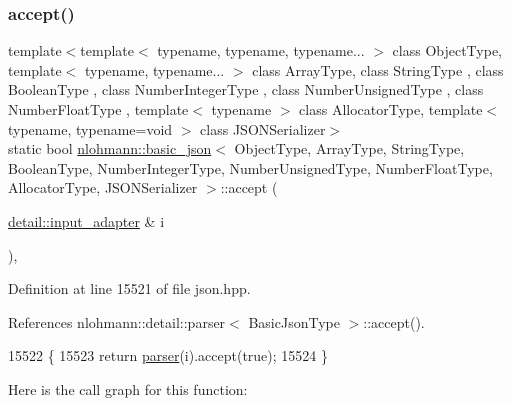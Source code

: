\subsubsection{\texorpdfstring{accept()}{accept()}\hspace{0.1cm}{\footnotesize\ttfamily [2/3]}}
{\footnotesize\ttfamily template$<$template$<$ typename, typename, typename... $>$ class Object\+Type, template$<$ typename, typename... $>$ class Array\+Type, class String\+Type , class Boolean\+Type , class Number\+Integer\+Type , class Number\+Unsigned\+Type , class Number\+Float\+Type , template$<$ typename $>$ class Allocator\+Type, template$<$ typename, typename=void $>$ class J\+S\+O\+N\+Serializer$>$ \\
static bool \hyperlink{classnlohmann_1_1basic__json}{nlohmann\+::basic\+\_\+json}$<$ Object\+Type, Array\+Type, String\+Type, Boolean\+Type, Number\+Integer\+Type, Number\+Unsigned\+Type, Number\+Float\+Type, Allocator\+Type, J\+S\+O\+N\+Serializer $>$\+::accept (\begin{DoxyParamCaption}\item[{\hyperlink{classnlohmann_1_1detail_1_1input__adapter}{detail\+::input\+\_\+adapter} \&}]{i }\end{DoxyParamCaption})\hspace{0.3cm}{\ttfamily [inline]}, {\ttfamily [static]}}



Definition at line 15521 of file json.\+hpp.



References nlohmann\+::detail\+::parser$<$ Basic\+Json\+Type $>$\+::accept().


\begin{DoxyCode}
15522     \{
15523         \textcolor{keywordflow}{return} \hyperlink{classnlohmann_1_1basic__json_aba9704e82d18f8954f9925e26cec7a51}{parser}(i).accept(\textcolor{keyword}{true});
15524     \}
\end{DoxyCode}
Here is the call graph for this function\+:
\mbox{\label{classnlohmann_1_1basic__json_ae797958b922732bf5fc01053d0659c1f}} 
